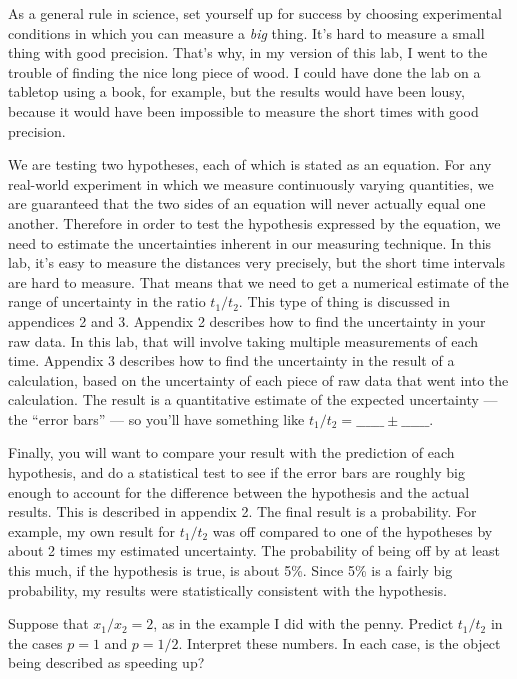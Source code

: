 As a general rule in science, set yourself up for success by choosing experimental conditions
in which you can measure a \emph{big} thing. It's hard to measure a small thing with good
precision. That's why, in my version of this lab, I went to the trouble of finding the nice
long piece of wood. I could have done the lab on a tabletop using a book, for example, but
the results would have been lousy, because it would have been impossible to measure the
short times with good precision.

\analysis

We are testing two hypotheses, each of which is stated as an equation. For any real-world
experiment in which we measure continuously varying quantities, we are guaranteed that the two sides of an equation will
never actually equal one another. Therefore in order to test the hypothesis expressed by the
equation, we need to estimate the uncertainties inherent in our measuring technique. In this
lab, it's easy to measure the distances very precisely, but the short time intervals are
hard to measure. That means that we need to get a numerical estimate of the range of uncertainty
in the ratio $t_1/t_2$. This type of thing is discussed in appendices 2 and 3.
Appendix 2 describes how to find the uncertainty in your raw data. In this
lab, that will involve taking multiple measurements of each time. Appendix 3 describes how
to find the uncertainty in the result of a calculation, based on the uncertainty of each piece
of raw data that went into the calculation. The result is a quantitative estimate of the expected
uncertainty --- the ``error bars'' --- so you'll have something like $t_1/t_2=\_\_\_\_\_\_ \pm \_\_\_\_\_\_$.

Finally,
you will want to compare your result with the prediction of each hypothesis, and do a statistical test to see if the
error bars are roughly big enough to account for the difference between the hypothesis and the actual results. This
is described in appendix 2.
The final result is a probability. For example, my own result for $t_1/t_2$ was off compared to one of
the hypotheses by about 2 times my estimated uncertainty. The probability of being off by at least this much, if the
hypothesis is true, is about 5\%. Since 5\% is a fairly big probability, my results were statistically consistent
with the hypothesis.


\prelab

\prelabquestion  
Suppose that $x_1/x_2=2$, as in the example I did with the penny. Predict $t_1/t_2$ in
the cases $p=1$ and $p=1/2$. Interpret these numbers. In each case, is the object
being described as speeding up?



